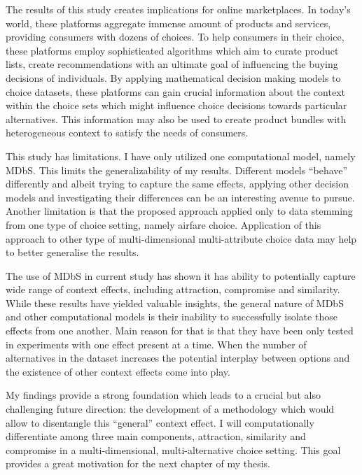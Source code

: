 \documentclass[a4paper,12pt]{article}
\begin{document}
The results of this study creates implications for online marketplaces. In today's world, these platforms aggregate immense amount of products and services, providing consumers with dozens of choices. To help consumers in their choice, these platforms employ sophisticated algorithms which aim to curate product lists, create recommendations with an ultimate goal of influencing the buying decisions of individuals. By applying mathematical decision making models to choice datasets, these platforms can gain crucial information about the context within the choice sets which might influence choice decisions towards particular alternatives. This information may also be used to create product bundles with heterogeneous context to satisfy the needs of consumers.

This study has limitations. I have only utilized one computational model, namely MDbS. This limits the generalizability of my results. Different models ``behave'' differently and albeit trying to capture the same effects, applying other decision models and investigating their differences can be an interesting avenue to pursue. Another limitation is that the proposed approach applied only to data stemming from one type of choice setting, namely airfare choice. Application of this approach to other type of multi-dimensional multi-attribute choice data may help to better generalise the results.

The use of MDbS in current study has shown it has ability to potentially capture wide range of context effects, including attraction, compromise and similarity. While these results have yielded valuable insights, the general nature of MDbS and other computational models is their inability to successfully isolate those effects from one another. Main reason for that is that they have been only tested in experiments with one effect present at a time. When the number of alternatives in the dataset increases the potential interplay between options and the existence of other context effects come into play. 

My findings provide a strong foundation which leads to a crucial but also challenging future direction: the development of a methodology which would allow to disentangle this ``general'' context effect. I will computationally differentiate among three main components, attraction, similarity and compromise in a multi-dimensional, multi-alternative choice setting. This goal provides a great motivation for the next chapter of my thesis.

\newpage
\end{document}
